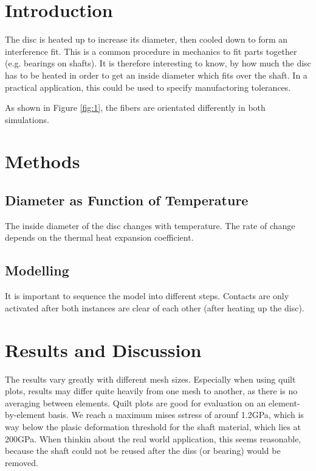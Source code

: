 \documentclass[12pt]{article}
\begin{document}
\tableofcontents
\pagebreak
\section{Introduction}

The disc is heated up to increase its diameter, then cooled down to form an interference fit.
This is a common procedure in mechanics to fit parts together (e.g. bearings on shafts).
It is therefore interesting to know, by how much the disc has to be heated in order to
get an inside diameter which fits over the shaft. In a practical application, this could be used
to specify manufactoring tolerances.



\noindent As shown in Figure \ref{fig:1}, the fibers are orientated differently in both simulations.

\newpage
\section{Methods}

\subsection{Diameter as Function of Temperature}

The inside diameter of the disc changes with temperature. The rate of change 
depends on the thermal heat expansion coefficient.




\subsection{Modelling}

It is important to sequence the model into different steps. Contacts are only activated after both
instances are clear of each other (after heating up the disc). 






\pagebreak
\section{Results and Discussion}

The results vary greatly with different mesh sizes. Especially when using quilt plots,
results may differ quite heavily from one mesh to another, as there is no averaging between elements.
Quilt plots are good for evaluation on an element-by-element basis.
We reach a maximum mises sstress of arounf 1.2GPa, which is way below the plasic deformation threshold
for the shaft material, which lies at 200GPa. When thinkin about the real world application, this seems
reasonable, because the shaft could not be reused after the diss (or bearing) would be removed.
\end{document}
